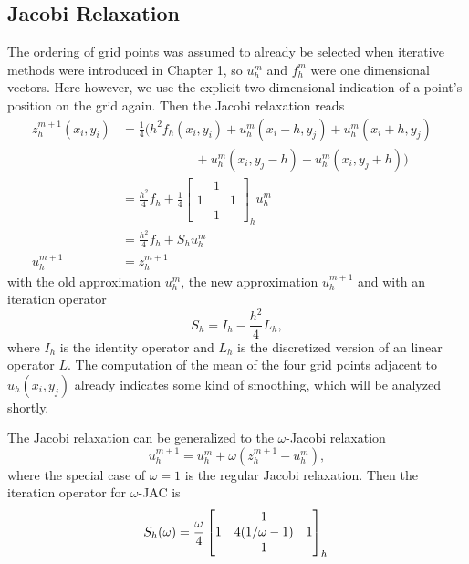 \subsection{Jacobi Relaxation}
The ordering of grid points was assumed to already be selected when iterative methods were introduced in Chapter 1, so $u_h^m$ and $f_h^m$ were one dimensional vectors. Here however, we use the explicit two-dimensional indication of a point's position on the grid again. Then the Jacobi relaxation reads 
\begin{align}
z_h^{m+1}(x_i, y_i)&= \frac{1}{4} \Big ( h^2 f_h(x_i, y_i) + u_h^m(x_i-h, y_j) + u_h^m(x_i+h, y_j) \nonumber \\
                  &~~~~~~~~~~~~~~~~~~~~~~~~~~+ u_h^m(x_i, y_j-h) + u_h^m(x_i,y_j+h) \Big ) \\
                  &= \frac{h^2}{4} f_h + \frac{1}{4} \begin{bmatrix}
                  &1 \\
                  1 & & 1\\
                  & 1& 
                  \end{bmatrix}_h u_h^m \nonumber \\
                  & = \frac{h^2}{4} f_h + S_h u_h^m \nonumber \\
        u_h^{m+1} &= z_h^{m+1} & \nonumber
\end{align}
 with the old approximation $u_h^{m}$, the new approximation $u_h^{m+1}$ and with an iteration operator 
 \begin{equation}
 S_h = I_h - \frac{h^2}{4} L_h,
 \end{equation}
 where $I_h$ is the identity operator and $L_h$ is the discretized version of an linear operator $L$. The computation of the mean of the four grid points adjacent to $u_h(x_i, y_j)$ already indicates some kind of smoothing, which will be analyzed shortly. 
 
The Jacobi relaxation can be generalized to the $\omega$-Jacobi relaxation
\begin{equation}
u_h^{m+1} = u_h^m + \omega (z_h^{m+1}-u_h^m),
\end{equation}
where the special case of $\omega = 1$ is the regular Jacobi relaxation. Then the iteration operator for $\omega$-JAC is 
\begin{equation}
S_h(\omega) = \frac{\omega}{4} \begin{bmatrix}
                  &1 \\
                  1 & 4(1/\omega -1) & 1\\
                  & 1& 
                  \end{bmatrix}_h\\
\end{equation}

